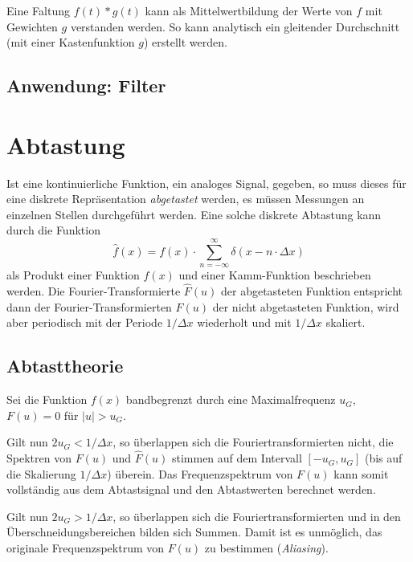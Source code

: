 		Eine Faltung \( f(t) \ast g(t) \) kann als Mittelwertbildung der Werte von \(f\) mit Gewichten \(g\) verstanden werden. So kann \bspw analytisch ein gleitender Durchschnitt (mit einer Kastenfunktion \(g\)) erstellt werden.
		
		\subsection{Anwendung: Filter} %

	\section{Abtastung}
		Ist eine kontinuierliche Funktion, \bzw ein analoges Signal, gegeben, so muss dieses für eine diskrete Repräsentation \emph{abgetastet} werden, \dh es müssen Messungen an einzelnen Stellen durchgeführt werden. Eine solche diskrete Abtastung kann durch die Funktion
		\begin{equation*}
			\hat{f}(x) = f(x) \cdot \sum_{n = -\infty}^{\infty} \delta(x - n \cdot \Delta x)
		\end{equation*}
		\dh als Produkt einer Funktion \( f(x) \) und einer Kamm-Funktion beschrieben werden. Die Fourier-Transformierte \( \hat{F}(u) \) der abgetasteten Funktion entspricht dann der Fourier-Transformierten \( F(u) \) der nicht abgetasteten Funktion, wird aber periodisch mit der Periode \( 1/\Delta x \) wiederholt und mit \( 1/\Delta x \) skaliert.

		\subsection{Abtasttheorie}
			Sei die Funktion \( f(x) \) bandbegrenzt durch eine Maximalfrequenz \( u_G \), \dh \( F(u) = 0 \) für \( \lvert u \rvert > u_G \).
			
			Gilt nun \( 2u_G < 1 / \Delta x \), so überlappen sich die Fouriertransformierten nicht, \dh die Spektren von \( F(u) \) und \( \hat{F}(u) \) stimmen auf dem Intervall \( [-u_G, u_G] \) (bis auf die Skalierung \( 1 / \Delta x \)) überein. Das Frequenzspektrum von \( F(u) \) kann somit vollständig aus dem Abtastsignal und den Abtastwerten berechnet werden.
			
			Gilt nun \( 2u_G > 1 / \Delta x \), so überlappen sich die Fouriertransformierten und in den Überschneidungsbereichen bilden sich Summen. Damit ist es unmöglich, das originale Frequenzspektrum von \( F(u) \) zu bestimmen (\emph{Aliasing}).

